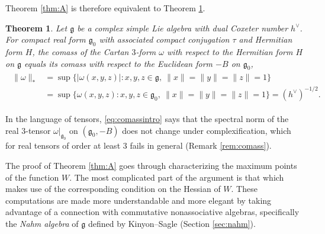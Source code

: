 \documentclass [leqno, 10pt]{amsart}
\newtheorem{theorem}{Theorem}[section]
\theoremstyle{definition}
\numberwithin{equation}{section}
\newcommand{\om}{\omega}
\newcommand{\g}{\mathfrak{g}}
\newcommand{\gz}{\g_{0}}
\newcommand{\hv}{h^\vee}
\newcommand{\norm}[1]{\lVert #1\rVert}
\newcommand{\comass}[1]{\lVert #1\rVert_{\ast}}%
\begin{document}
Theorem \ref{thm:A} is therefore equivalent to Theorem \ref{thm:comass}.
\begin{theorem}\label{thm:comass}
Let $\g$ be a complex simple Lie algebra with dual Coxeter number $\hv$. For compact real form $\gz$ with associated compact conjugation $\tau$ and Hermitian form $H$, the comass of the Cartan $3$-form $\om$ with respect to the Hermitian form $H$ on $\g$ equals its comass with respect to the Euclidean form $-B$ on $\gz$,
\begin{align}\label{eq:comassintro}
\begin{aligned}
\comass{\om} &= \sup\big\{|\om(x, y, z)|: x, y, z \in \g,\ \norm{x} = \norm{y} = \norm{z} = 1\big\}\\
&= \sup\big\{\om(x, y, z): x, y, z \in \gz,\ \norm{x} = \norm{y} = \norm{z} = 1\big\} = (\hv)^{-1/2}.
\end{aligned}
\end{align}
\end{theorem}
In the language of tensors, \eqref{eq:comassintro} says that the spectral norm of the real $3$-tensor $\om|_{\gz}$ on $(\gz, -B)$ does not change under complexification, which for real tensors of order at least $3$ fails in general (Remark \ref{rem:comass}).

The proof of Theorem \ref{thm:A} goes through characterizing the maximum points of the function $W$. The most complicated part of the argument is that which makes use of the corresponding condition on the Hessian of $W$. These computations are made more understandable and more elegant by taking advantage of a connection with commutative nonassociative algebras, specifically the \emph{Nahm algebra} of $\g$ defined by Kinyon--Sagle \cite{Kinyon-Sagle} (Section \ref{sec:nahm}).
\end{document}
